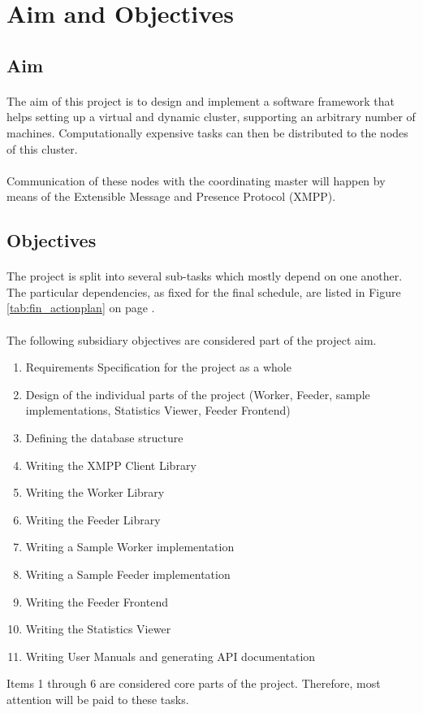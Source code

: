 \section{Aim and Objectives}

\subsection{Aim}
\paragraph{}
The aim of this project is to design and implement a software framework that helps setting up a virtual and dynamic cluster, supporting an arbitrary number of machines. Computationally expensive tasks can then be distributed to the nodes of this cluster.
\paragraph{}
Communication of these nodes with the coordinating master will happen by means of the Extensible Message and Presence Protocol (XMPP).

\subsection{Objectives}
\paragraph{}
The project is split into several sub-tasks which mostly depend on one another. The particular dependencies, as fixed for the final schedule, are listed in Figure \ref{tab:fin_actionplan} on page \pageref{tab:fin_actionplan}.

\paragraph{}
The following subsidiary objectives are considered part of the project aim.
\begin{enumerate}
\item Requirements Specification for the project as a whole
\item Design of the individual parts of the project (Worker, Feeder, sample implementations, Statistics Viewer, Feeder Frontend)
\item Defining the database structure
\item Writing the XMPP Client Library
\item Writing the Worker Library
\item Writing the Feeder Library
\item Writing a Sample Worker implementation
\item Writing a Sample Feeder implementation
\item Writing the Feeder Frontend
\item Writing the Statistics Viewer
\item Writing User Manuals and generating API documentation
\end{enumerate}
Items 1 through 6 are considered core parts of the project. Therefore, most attention will be paid to these tasks.
